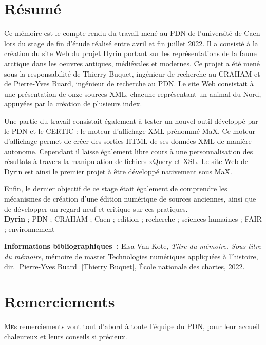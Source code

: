 \documentclass[a4paper,12pt,twoside]{book}
\begin{document}
	\chapter{Résumé}
	\medskip
	Ce mémoire est le compte-rendu du travail mené au \acrfull{PDN} de l'université de Caen lors du stage de fin d'étude réalisé entre avril et fin juillet 2022. Il a consisté à la création du site Web du projet Dyrin portant sur les représentations de la faune arctique dans les oeuvres antiques, médiévales et modernes. Ce projet a été mené sous la responsabilité de Thierry Buquet, ingénieur de recherche au \acrfull{CRAHAM} et de Pierre-Yves Buard, ingénieur de recherche au \acrlong{PDN}. Le site Web consistait à une présentation de onze sources XML, chacune représentant un animal du Nord, appuyées par la création de plusieurs index.
	
	Une partie du travail consistait également à tester un nouvel outil développé par le \acrshort{PDN} et le \acrfull{CERTIC} : le moteur d'affichage XML prénommé MaX. Ce moteur d'affichage permet de créer des sorties HTML de ses données XML de manière autonome. Cependant il laisse également libre cours à une personnalisation des résultats à travers la manipulation de fichiers xQuery et XSL. Le site Web de Dyrin est ainsi le premier projet à être développé nativement sous MaX.
	
	Enfin, le dernier objectif de ce stage était également de comprendre les mécanismes de création d'une édition numérique de sources anciennes, ainsi que de développer un regard neuf et critique sur ces pratiques. \\
	
	\textbf{Dyrin} ; {PDN} ; {CRAHAM} ; {Caen} ; {edition} ; {recherche} ; {sciences-humaines} ; {FAIR} ; {environnement}
	
	\textbf{Informations bibliographiques~:} Elsa Van Kote, \textit{Titre du mémoire. Sous-titre du mémoire}, mémoire de master \og{}Technologies numériques appliquées à l'histoire\fg{}, dir. [Pierre-Yves Buard] [Thierry Buquet], École nationale des chartes, 2022.
	
	\chapter{Remerciements}
	
	\lettrine{M}es remerciements vont tout d'abord à toute l'équipe du \acrshort{PDN}, pour leur accueil chaleureux et leurs conseils si précieux.\\
	
\end{document}

